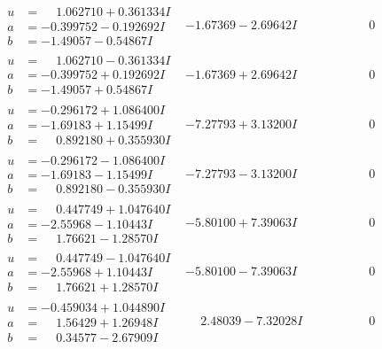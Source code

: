 \documentclass[1p]{elsarticle_modified}
\theoremstyle{definition}
\begin{document}
$$\begin{array}{c|c|c}
\begin{aligned}
u &= \phantom{-}1.062710 + 0.361334 I \\
a &= -0.399752 - 0.192692 I \\
b &= -1.49057 - 0.54867 I\end{aligned}
 & -1.67369 - 2.69642 I & \phantom{-0.000000 } 0 \\ \hline\begin{aligned}
u &= \phantom{-}1.062710 - 0.361334 I \\
a &= -0.399752 + 0.192692 I \\
b &= -1.49057 + 0.54867 I\end{aligned}
 & -1.67369 + 2.69642 I & \phantom{-0.000000 } 0 \\ \hline\begin{aligned}
u &= -0.296172 + 1.086400 I \\
a &= -1.69183 + 1.15499 I \\
b &= \phantom{-}0.892180 + 0.355930 I\end{aligned}
 & -7.27793 + 3.13200 I & \phantom{-0.000000 } 0 \\ \hline\begin{aligned}
u &= -0.296172 - 1.086400 I \\
a &= -1.69183 - 1.15499 I \\
b &= \phantom{-}0.892180 - 0.355930 I\end{aligned}
 & -7.27793 - 3.13200 I & \phantom{-0.000000 } 0 \\ \hline\begin{aligned}
u &= \phantom{-}0.447749 + 1.047640 I \\
a &= -2.55968 - 1.10443 I \\
b &= \phantom{-}1.76621 - 1.28570 I\end{aligned}
 & -5.80100 + 7.39063 I & \phantom{-0.000000 } 0 \\ \hline\begin{aligned}
u &= \phantom{-}0.447749 - 1.047640 I \\
a &= -2.55968 + 1.10443 I \\
b &= \phantom{-}1.76621 + 1.28570 I\end{aligned}
 & -5.80100 - 7.39063 I & \phantom{-0.000000 } 0 \\ \hline\begin{aligned}
u &= -0.459034 + 1.044890 I \\
a &= \phantom{-}1.56429 + 1.26948 I \\
b &= \phantom{-}0.34577 - 2.67909 I\end{aligned}
 & \phantom{-}2.48039 - 7.32028 I & \phantom{-0.000000 } 0 \\ \hline\begin{aligned}

\end{aligned}
\end{array}$$
\end{document}
